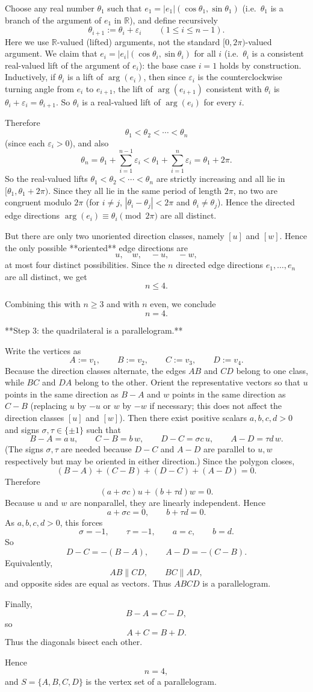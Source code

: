 Choose any real number $\theta_1$ such that $e_1=|e_1|(\cos\theta_1,\sin\theta_1)$ (i.e.\ $\theta_1$ is a branch of the argument of $e_1$ in $\mathbb{R}$), and define recursively
\[
\theta_{i+1}:=\theta_i+\varepsilon_i\qquad (1\le i\le n-1).
\]
Here we use $\mathbb{R}$-valued (lifted) arguments, not the standard $[0,2\pi)$-valued argument. We claim that $e_i = |e_i|(\cos\theta_i,\sin\theta_i)$ for all $i$ (i.e.\ $\theta_i$ is a consistent real-valued lift of the argument of $e_i$): the base case $i=1$ holds by construction. Inductively, if $\theta_i$ is a lift of $\arg(e_i)$, then since $\varepsilon_i$ is the counterclockwise turning angle from $e_i$ to $e_{i+1}$, the lift of $\arg(e_{i+1})$ consistent with $\theta_i$ is $\theta_i+\varepsilon_i=\theta_{i+1}$. So $\theta_i$ is a real-valued lift of $\arg(e_i)$ for every $i$.

Therefore
\[
\theta_1<\theta_2<\cdots<\theta_n
\]
(since each $\varepsilon_i>0$), and also
\[
\theta_n
=\theta_1+\sum_{i=1}^{n-1}\varepsilon_i
<\theta_1+\sum_{i=1}^{n}\varepsilon_i
=\theta_1+2\pi.
\]
So the real-valued lifts $\theta_1<\theta_2<\cdots<\theta_n$ are strictly increasing and all lie in $[\theta_1,\theta_1+2\pi)$. Since they all lie in the same period of length $2\pi$, no two are congruent modulo $2\pi$ (for $i\neq j$, $|\theta_i-\theta_j|<2\pi$ and $\theta_i\neq\theta_j$). Hence the directed edge directions $\arg(e_i)\equiv\theta_i\pmod{2\pi}$ are all distinct.

But there are only two unoriented direction classes, namely $[u]$ and $[w]$. Hence the only possible **oriented** edge directions are
\[
u,\quad w,\quad -u,\quad -w,
\]
at most four distinct possibilities. Since the $n$ directed edge directions $e_1,\dots,e_n$ are all distinct, we get
\[
n\le 4.
\]

Combining this with $n\ge 3$ and with $n$ even, we conclude
\[
n=4.
\]

**Step $3$: the quadrilateral is a parallelogram.**

Write the vertices as
\[
A:=v_1,\qquad B:=v_2,\qquad C:=v_3,\qquad D:=v_4.
\]
Because the direction classes alternate, the edges $AB$ and $CD$ belong to one class, while $BC$ and $DA$ belong to the other. Orient the representative vectors so that $u$ points in the same direction as $B-A$ and $w$ points in the same direction as $C-B$ (replacing $u$ by $-u$ or $w$ by $-w$ if necessary; this does not affect the direction classes $[u]$ and $[w]$). Then there exist positive scalars $a,b,c,d>0$ and signs $\sigma,\tau\in\{\pm1\}$ such that
\[
B-A=a\,u,\qquad C-B=b\,w,\qquad D-C=\sigma c\,u,\qquad A-D=\tau d\,w.
\]
(The signs $\sigma,\tau$ are needed because $D-C$ and $A-D$ are parallel to $u,w$ respectively but may be oriented in either direction.)
Since the polygon closes,
\[
(B-A)+(C-B)+(D-C)+(A-D)=0.
\]
Therefore
\[
(a+\sigma c)u+(b+\tau d)w=0.
\]
Because $u$ and $w$ are nonparallel, they are linearly independent. Hence
\[
a+\sigma c=0,\qquad b+\tau d=0.
\]
As $a,b,c,d>0$, this forces
\[
\sigma=-1,\qquad \tau=-1,\qquad a=c,\qquad b=d.
\]
So
\[
D-C=-(B-A),\qquad A-D=-(C-B).
\]
Equivalently,
\[
AB\parallel CD,\qquad BC\parallel AD,
\]
and opposite sides are equal as vectors. Thus $ABCD$ is a parallelogram.

Finally,
\[
B-A=C-D,
\]
so
\[
A+C=B+D.
\]
Thus the diagonals bisect each other.

Hence
\[
n=4,
\]
and $S=\{A,B,C,D\}$ is the vertex set of a parallelogram.